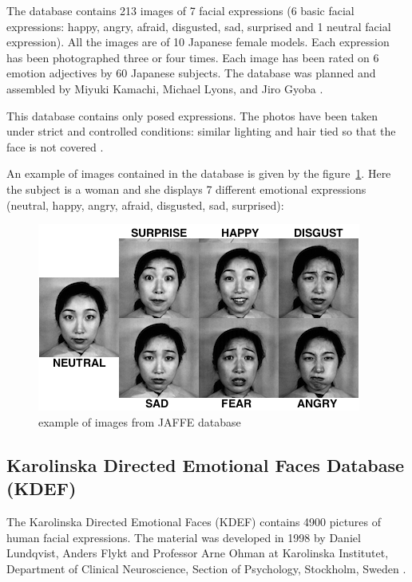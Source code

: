 \vspace{\baselineskip}
\noindent The database contains 213 images of 7 facial expressions (6 basic facial expressions: happy, angry, afraid, disgusted, sad, surprised and 1 neutral facial expression). All the images are of 10 Japanese female models. Each expression has been photographed three or four times. Each image has been rated on 6 emotion adjectives by 60 Japanese subjects. The database was planned and assembled by Miyuki Kamachi, Michael Lyons, and Jiro Gyoba \cite{JAFFE}.
\newline

\noindent This database contains only posed expressions. The photos have been taken under strict  and controlled conditions: similar lighting and hair tied so that the face is not covered \cite{BET12}. 
\newline

\noindent An example of images contained in the database is given by the figure~\ref{jaffe_7facialexpressions}. Here the subject is a woman and she displays 7 different emotional expressions (neutral, happy, angry, afraid, disgusted, sad, surprised): 
\newline

\begin{figure}[!h]
\begin{center}
\noindent \includegraphics[scale=0.75]{figures/jaffe_7facialexpressions} 
\newline
\caption{example of images from JAFFE database}
\label{jaffe_7facialexpressions}
\end{center} 
\end{figure}

\subsection{Karolinska Directed Emotional Faces Database (KDEF)}

\vspace{\baselineskip}
\noindent The Karolinska Directed Emotional Faces (KDEF) contains 4900 pictures of human facial expressions. The material was developed in 1998 by Daniel Lundqvist, Anders Flykt and Professor Arne Ohman at Karolinska Institutet, Department of Clinical Neuroscience, Section of Psychology, Stockholm, Sweden \cite{KDEF}.
\newline

